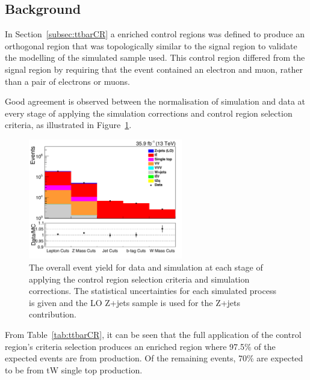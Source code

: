 \newpage
\subsection{\ttbar Background}\label{subsec:ttbarEstimation}
In Section~\ref{subsec:ttbarCR} a \ttbar enriched control regions was defined to produce an orthogonal region that was topologically similar to the signal region to validate the modelling of the simulated \ttbar sample used.
This control region differed from the signal region by requiring that the event contained an electron and muon, rather than a pair of electrons or muons.

Good agreement is observed between the normalisation of simulation and data at every stage of applying the simulation corrections and control region selection criteria, as illustrated in Figure~\ref{fig:ttbar_cutFlow}.

\begin{figure}[!h]
\centering
\includegraphics[width=0.6\textwidth]{figs/background-estimation/plots/unblinded/ttbar_control/cutFlow_log.pdf}
\caption{
The overall event yield for data and simulation at each stage of applying the \ttbar control region selection criteria and simulation corrections. The statistical uncertainties for each simulated process is given and the LO Z+jets sample is used for the Z+jets contribution.
}
\label{fig:ttbar_cutFlow}
\end{figure}

From Table~\ref{tab:ttbarCR}, it can be seen that the full application of the control region's criteria selection produces an enriched region where 97.5\% of the expected events are from \ttbar production.
Of the remaining events, 70\% are expected to be from tW single top production.

